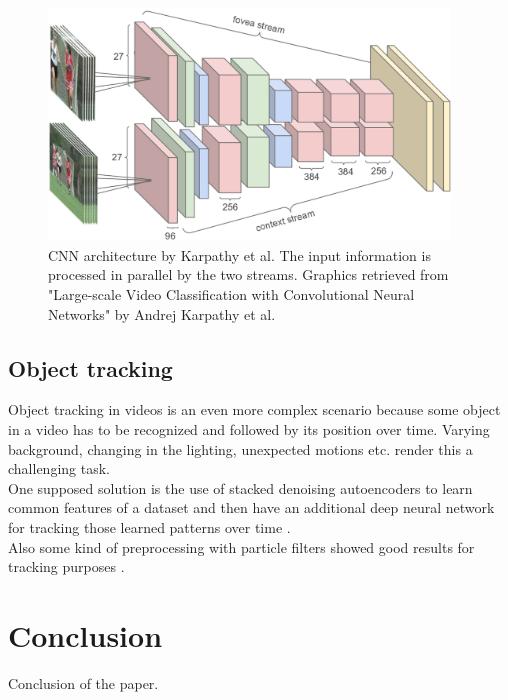 \documentclass[12pt,twoside]{article}
\theoremstyle{plain}
\theoremstyle{definition}
\theoremstyle{remark}
\begin{document}
\begin{figure}[H]
	\centerline{
		\includegraphics[width=0.95\textwidth]{google-architecture.png}
	}
	{\caption{CNN architecture by Karpathy et al. The input information is processed in parallel by the two streams. Graphics retrieved from "Large-scale Video Classification with Convolutional Neural Networks" by Andrej Karpathy et al. \cite{GoogleLargeScaleVideoClassification-Karpathy}}\label{fig:google-architecture-two-streams}}
\end{figure}


\subsection{Object tracking}

Object tracking in videos is an even more complex scenario because some object in a video has to be recognized and followed by its position over time. Varying background, changing in the lighting, unexpected motions etc. render this a challenging task.
\\
One supposed solution is the use of stacked denoising autoencoders to learn common features of a dataset and then have an additional deep neural network for tracking those learned patterns over time \cite{LearningDeepCompactImageTracking-Wang}.
\\
Also some kind of preprocessing with particle filters showed good results for tracking purposes \cite{LearningDeepCompactImageTracking-Wang}.




\section{Conclusion}
\label{sec:concl}

Conclusion of the paper.




%
%
\newpage


\end{document}

